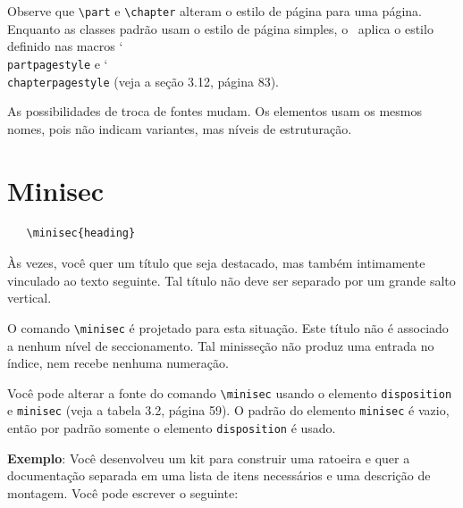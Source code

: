 Observe que \verb|\part| e \verb|\chapter| alteram o estilo de página para uma página. Enquanto as classes padrão usam o estilo de página simples, o \KOMAScript\ aplica o estilo definido nas macros \char`\\\texttt{part\-pa\-ge\-sty\-le} e \char`\\\texttt{chap\-ter\-pa\-ge\-sty\-le} (veja a seção 3.12, página 83).

As possibilidades de troca de fontes mudam. Os elementos usam os mesmos nomes, pois não indicam variantes, mas níveis de estruturação.

\section{Minisec}
\begin{verbatim}
   \minisec{heading} 
\end{verbatim}

Às vezes, você quer um título que seja destacado, mas também intimamente vinculado ao texto seguinte. Tal título não deve ser separado por um grande salto vertical.

O comando \verb|\minisec| é projetado para esta situação. Este título não é associado a nenhum nível de seccionamento. Tal minisseção não produz uma entrada no índice, nem recebe nenhuma numeração.

Você pode alterar a fonte do comando \verb|\minisec| usando o elemento \texttt{disposition} e \texttt{minisec} (veja a tabela 3.2, página 59). O padrão do elemento \texttt{minisec} é vazio, então por padrão somente o elemento \texttt{disposition} é usado.

\textbf{Exemplo}: Você desenvolveu um kit para construir uma ratoeira e quer a documentação separada em uma lista de itens necessários e uma descrição de montagem. Você pode escrever o seguinte:


